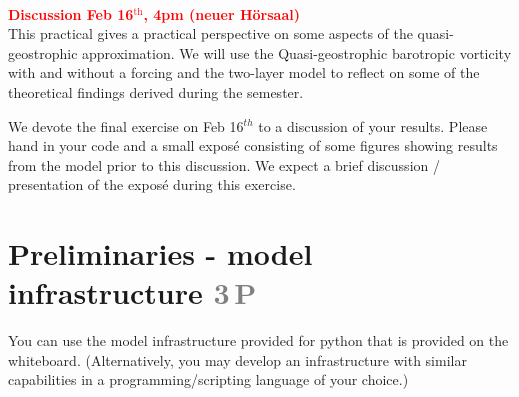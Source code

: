 \documentclass[jobname=project, 10pt]{article}
\newcommand{\task}[2]{\section{#1 \hfill \normalsize\normalfont \textcolor{gray}{#2\,P}}\addtocounter{ptot}{#2}}
\newcounter{ptot}
\begin{document}
~\\[-3em]
\phantom{AA}\hfill \textcolor{red}{\textbf{Discussion Feb 16$^\mathrm{th}$, 4pm (neuer H\"orsaal)}} \\
This practical gives a practical perspective on some aspects of the quasi-geostrophic approximation.
We will use the Quasi-geostrophic barotropic vorticity with and without a forcing and the two-layer model
to reflect on some of the theoretical findings derived during the semester.
%
\par
% 
We devote the final exercise on Feb 16$^{th}$ to a discussion of your results. Please hand in your code and a small expos\'e consisting of some figures showing results from the model prior to this discussion. We expect a brief discussion / presentation of the expos\'e during this exercise. 

\task{Preliminaries - model infrastructure}{3}

You can use the model infrastructure provided for python that is provided on the whiteboard. (Alternatively, you may develop an infrastructure with similar capabilities in a programming/scripting language of your choice.) \\ 
\end{document}
